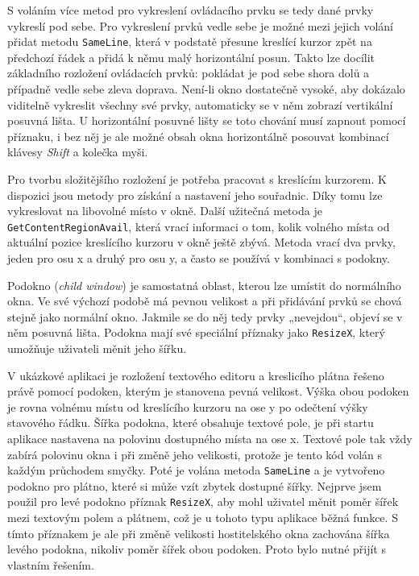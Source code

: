 \documentclass[FM,DP]{tulthesis}
\begin{document}
	S voláním více metod pro vykreslení ovládacího prvku se tedy dané prvky vykreslí pod sebe. Pro vykreslení prvků vedle sebe je možné mezi jejich volání přidat metodu \texttt{SameLine}, která v podstatě přesune kreslící kurzor zpět na předchozí řádek a přidá k němu malý horizontální posun. Takto lze docílit základního rozložení ovládacích prvků: pokládat je pod sebe shora dolů a případně vedle sebe zleva doprava. Není-li okno dostatečně vysoké, aby dokázalo viditelně vykreslit všechny své prvky, automaticky se v něm zobrazí vertikální posuvná lišta. U horizontální posuvné lišty se toto chování musí zapnout pomocí příznaku, i bez něj je ale možné obsah okna horizontálně posouvat kombinací klávesy \textit{Shift} a kolečka myši.
	
	Pro tvorbu složitějšího rozložení je potřeba pracovat s kreslícím kurzorem. K dispozici jsou metody pro získání a nastavení jeho souřadnic. Díky tomu lze vykreslovat na libovolné místo v okně. Další užitečná metoda je \texttt{GetContentRegionAvail}, která vrací informaci o tom, kolik volného místa od aktuální pozice kreslícího kurzoru v okně ještě zbývá. Metoda vrací dva prvky, jeden pro osu x a druhý pro osu y, a často se používá v kombinaci s podokny.
	
	Podokno (\textit{child window}) je samostatná oblast, kterou lze umístit do normálního okna. Ve své výchozí podobě má pevnou velikost a při přidávání prvků se chová stejně jako normální okno. Jakmile se do něj tedy prvky „nevejdou“, objeví se v něm posuvná lišta. Podokna mají své speciální příznaky jako \texttt{ResizeX}, který umožňuje uživateli měnit jeho šířku.

	V ukázkové aplikaci je rozložení textového editoru a kreslicího plátna řešeno právě pomocí podoken, kterým je stanovena pevná velikost. Výška obou podoken je rovna volnému místu od kreslícího kurzoru na ose y po odečtení výšky stavového řádku. Šířka podokna, které obsahuje textové pole, je při startu aplikace nastavena na polovinu dostupného místa na ose x. Textové pole tak vždy zabírá polovinu okna i při změně jeho velikosti, protože je tento kód volán s každým průchodem smyčky. Poté je volána metoda \texttt{SameLine} a je vytvořeno podokno pro plátno, které si může vzít zbytek dostupné šířky. Nejprve jsem použil pro levé podokno příznak \texttt{ResizeX}, aby mohl uživatel měnit poměr šířek mezi textovým polem a plátnem, což je u tohoto typu aplikace běžná funkce. S tímto příznakem je ale při změně velikosti hostitelského okna zachována šířka levého podokna, nikoliv poměr šířek obou podoken. Proto bylo nutné přijít s vlastním řešením.
	
\end{document}

